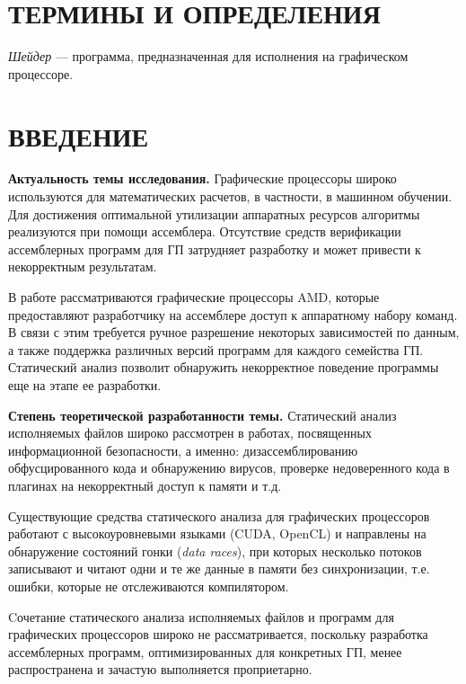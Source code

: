 \documentclass[a4paper,14pt]{extarticle}
\newcommand{\topic}[1]{\textbf{#1.}}
\begin{document}
\tableofcontents
\newpage

\section*{ТЕРМИНЫ И ОПРЕДЕЛЕНИЯ}

\textit{Шейдер} — программа, предназначенная для исполнения на графическом процессоре.

\newpage

\section*{ВВЕДЕНИЕ}

\topic{Актуальность темы исследования} Графические процессоры широко используются
для математических расчетов, в частности, в машинном обучении. Для достижения оптимальной
утилизации аппаратных ресурсов алгоритмы реализуются при помощи ассемблера.
Отсутствие средств верификации ассемблерных программ для ГП затрудняет разработку
и может привести к некорректным результатам.

В работе рассматриваются графические процессоры AMD, которые предоставляют разработчику
на ассемблере доступ к аппаратному набору команд. В связи с этим требуется ручное
разрешение некоторых зависимостей по данным, а также поддержка различных версий программ
для каждого семейства ГП. Статический анализ позволит обнаружить некорректное
поведение программы еще на этапе ее разработки.

\topic{Степень теоретической разработанности темы} Статический анализ исполняемых файлов
широко рассмотрен в работах, посвященных информационной безопасности, а именно:
дизассемблированию обфусцированного кода и обнаружению вирусов,
проверке недоверенного кода в плагинах на некорректный доступ к памяти и т.д.\cite{static-analysis-binary}

Существующие средства статического анализа для графических процессоров работают с
высокоуровневыми языками (CUDA, OpenCL) и направлены на обнаружение состояний
гонки (\textit{data races}), при которых несколько потоков записывают
и читают одни и те же данные в памяти без синхронизации, т.е. ошибки, которые
не отслеживаются компилятором\cite{gpu-static-verification}.

Cочетание статического анализа исполняемых файлов и программ для графических
процессоров широко не рассматривается, поскольку разработка ассемблерных программ,
оптимизированных для конкретных ГП, менее распространена и зачастую выполняется
проприетарно.
\end{document}

